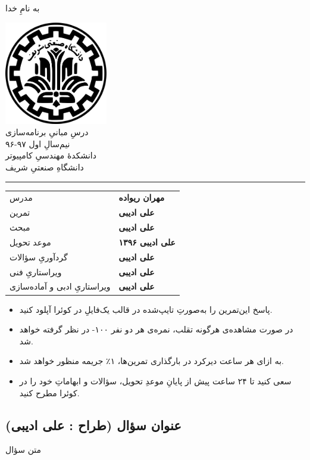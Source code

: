 \documentclass[11pt]{article}
\begin{document}
	\thispagestyle{empty}
	
	\begin{center}
		به نامِ خدا
	
		\vskip 60mm
	
		\includegraphics[width=4.5cm]{sharif-logo}\\
		\vskip 10mm
		\huge{درسِ مبانیِ برنامه‌سازی} \\
		\bigskip
		\bigskip
		\large{نیم‌سالِ اول ۹۷-۹۶} \\
		\bigskip
		دانشکدهٔ مهندسیِ کامپیوتر\\
		\medskip
		دانشگاهِ صنعتیِ شریف \\
		\bigskip
		\hrule height 2pt
		\medskip
		
		{\def\arraystretch{1.3}
		\begin{tabular}{>{\raggedright}p{} >{\raggedleft}p{}}
			مدرس & \textbf{مهران ریواده} \tabularnewline
			تمرین & \textbf{علی ادیبی} \tabularnewline
			مبحث & \textbf{علی ادیبی} \tabularnewline
			موعد تحویل & \textbf{علی ادیبی ۱۳۹۶} \tabularnewline
			گردآوریِ سؤالات & \textbf{علی ادیبی} \tabularnewline
			ویراستاریِ فنی & \textbf{علی ادیبی} \tabularnewline
			ویراستاریِ ادبی و آماده‌سازی & \textbf{علی ادیبی} \tabularnewline
		\end{tabular}}


		\bigskip


	\end{center}
	\begin{large}
	\begin{itemize}
	\item{پاسخ این‌تمرین را به‌صورتِ تایپ‌شده در قالب یک‌فایلِ  در کوئرا آپلود کنید.}
	\item{در صورت مشاهده‌ی هرگونه تقلب، نمره‌ی هر دو نفر ۱۰۰- در نظر گرفته خواهد شد.}
	\item{به ازای هر ساعت دیرکرد در بارگذاری تمرین‌ها، ۱٪ جریمه منظور خواهد شد.}
	\item{سعی کنید تا ۲۴ ساعت پیش از پایانِ موعدِ تحویل، سؤالات و ابهاماتِ خود را در کوئرا مطرح کنید.}
	\end{itemize}
	\end{large}
	\pagebreak
	

\pagestyle{fancy}

\subsection*{عنوان سؤال (طراح : علی ادیبی)}
متن سؤال

\end{document}

